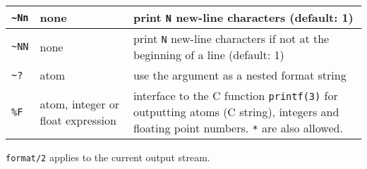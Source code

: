 \begin{tabular}{|C{1.4cm}|C{2.8cm}|p{10.45cm}|}
\texttt{\~{}Nn} & none & print \texttt{N} new-line characters (default: 1) \\

\hline

\texttt{\~{}NN} & none & print \texttt{N} new-line characters if not at the beginning
of a line (default: 1) \\

\hline

\texttt{\~{}?} & atom & use the argument as a nested format string \\

\hline

\texttt{\%F} & atom, integer or float expression & interface to the C function
                                                   \texttt{printf(3)} for outputting
                                                   atoms (C string), integers and
                                                   floating point numbers.
                                                   \texttt{*} are also allowed. \\

\hline
\end{tabular}

\texttt{format/2} applies to the current output stream.

